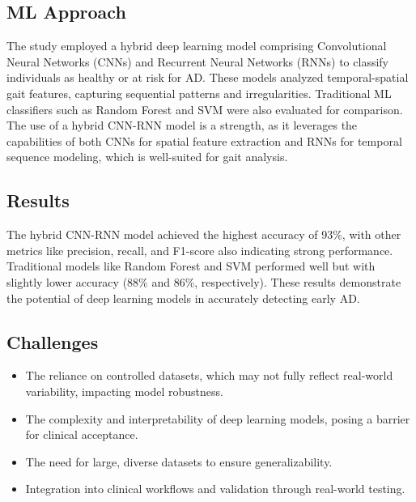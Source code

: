 \subsection*{ML Approach}
The study employed a hybrid deep learning model comprising Convolutional Neural Networks (CNNs) and Recurrent Neural Networks (RNNs) to classify individuals as healthy or at risk for AD. These models analyzed temporal-spatial gait features, capturing sequential patterns and irregularities. Traditional ML classifiers such as Random Forest and SVM were also evaluated for comparison. The use of a hybrid CNN-RNN model is a strength, as it leverages the capabilities of both CNNs for spatial feature extraction and RNNs for temporal sequence modeling, which is well-suited for gait analysis.

\subsection*{Results}
The hybrid CNN-RNN model achieved the highest accuracy of 93\%, with other metrics like precision, recall, and F1-score also indicating strong performance. Traditional models like Random Forest and SVM performed well but with slightly lower accuracy (88\% and 86\%, respectively). These results demonstrate the potential of deep learning models in accurately detecting early AD.

\subsection*{Challenges}
\begin{itemize}
    \item The reliance on controlled datasets, which may not fully reflect real-world variability, impacting model robustness.
    \item The complexity and interpretability of deep learning models, posing a barrier for clinical acceptance.
    \item The need for large, diverse datasets to ensure generalizability.
    \item Integration into clinical workflows and validation through real-world testing.
\end{itemize}


